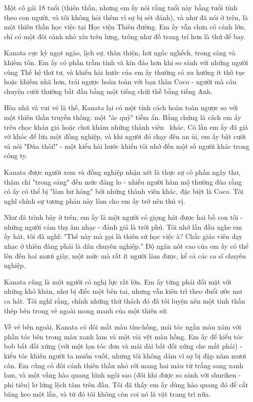\documentclass[../main.tex]{subfiles}
\begin{document}
Một cô gái 18 tuổi (thiên thần, nhưng em ấy nói rằng tuổi này bằng tuổi tính theo con người, và tôi không hỏi thêm vì sợ bị sét đánh), và như đã nói ở trên, là một thiên thần học việc tại Học viện Thiên đường. Em ấy vẫn chưa có cánh lớn, chỉ có một đôi cánh nhỏ xíu trên lưng, trông như đồ trang trí hơn là thứ để bay.

Kanata cực kỳ ngọt ngào, lịch sự, thân thiện, hơi ngốc nghếch, trong sáng và khiêm tốn. Em ấy có phần trầm tính và kín đáo hơn khi so sánh với những người cùng Thế hệ thứ tư, và khiếu hài hước của em ấy thường có xu hướng ít thô tục hoặc khiếm nhã hơn, trái ngược hoàn toàn với bạn thân Coco - người mà câu chuyện cười thường bắt đầu bằng một tiếng chửi thề bằng tiếng Anh.


Hòa nhã và vui vẻ là thế, Kanata lại có một tính cách hoàn toàn ngược so với một thiên thần truyền thống: một "ác quỷ" tiềm ẩn. Bằng chứng là cách em ấy trêu chọc khán giả hoặc chơi khăm những thành viên \hll\ khác. Có lần em ấy đã giả vờ khóc để lừa một đồng nghiệp, và khi người đó chạy đến an ủi, em ấy bật cười và nói "Đùa thôi!" - một kiểu hài hước khiến tôi nhớ đến một số người khác trong công ty.

Kanata được người xem và đồng nghiệp nhận xét là thực sự có phần ngây thơ, thậm chí "trong sáng" đến mức đáng lo - nhiều người hâm mộ thường đùa rằng cô ấy có thể bị "làm hư hỏng" bởi những thành viên khác, đặc biệt là Coco. Tôi nghĩ chính sự tương phản này làm cho em ấy trở nên thú vị.

Như đã trình bày ở trên, em ấy là một người có giọng hát được hai bố con tôi - những người cảm thụ âm nhạc - đánh giá là trời phú. Tôi nhớ lần đầu nghe em ấy hát, tôi đã nghĩ: "Thế này mà gọi là thiên sứ học việc à? Chắc giáo viên dạy nhạc ở thiên đàng phải là dân chuyên nghiệp." Độ ngân nốt cao của em ấy có thể lên đến hai mươi giây, một mức mà rất ít người làm được, kể cả các ca sĩ chuyên nghiệp.

Kanata cũng là một người có nghị lực rất lớn. Em ấy từng phải đối mặt với những khó khăn, như bị điếc một bên tai, nhưng vẫn kiên trì theo đuổi ước mơ ca hát. Tôi nghĩ rằng, chính những thử thách đó đã tôi luyện nên một tinh thần thép bên trong vẻ ngoài mong manh của một thiên sứ.

Về vẻ bên ngoài, Kanata có đôi mắt màu tím-hồng, mái tóc ngắn màu xám với phần tóc bên trong màu xanh lam và một vài vệt màu hồng. Em ấy để kiểu tóc bob bất đối xứng (với một lọn tóc đơn và mái dài bất đối xứng che mắt phải) - kiểu tóc khiến người ta muốn vuốt, nhưng tôi không dám vì sợ bị đập năm mươi cân. Em cũng có đôi cánh thiên thần nhỏ rời mang hai màu từ trắng sang xanh lam, và một vầng hào quang hình ngôi sao (đôi khi được so sánh với shuriken - phi tiêu) lơ lửng lệch tâm trên đầu. Tôi đã thấy em ấy dùng hào quang đó để cắt băng keo một lần, và từ đó tôi không còn coi nó là vật trang trí nữa.
\end{document}
